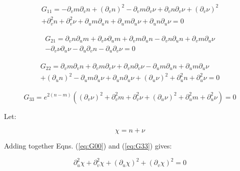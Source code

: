 \documentclass{article}
\begin{document}
\begin{equation}
\begin{split}
G_{11}=-\partial_{v}m\partial_{v}n+\left(\partial_{v}n\right)^{2}-\partial_{v}m\partial_{v}\nu+\partial_{v}n\partial_{v}\nu+\left(\partial_{v}\nu\right)^{2}\\
+\partial_{v}^{2}n+\partial_{v}^{2}\nu+\partial_{u}m\partial_{u}n+\partial_{u}m\partial_{u}\nu+\partial_{u}n\partial_{u}\nu=0
\end{split}
\end{equation}


\begin{equation}
\begin{split}
G_{21}=\partial_{v}n\partial_{u}m+\partial_{v}\nu\partial_{u}m+\partial_{v}m\partial_{u}n-\partial_{v}n\partial_{u}n+\partial_{v}m\partial_{u}\nu\\
-\partial_{v}\nu\partial_{u}\nu-\partial_{u}\partial_{v}n-\partial_{u}\partial_{v}\nu=0
\end{split}
\end{equation}


\begin{equation}
\begin{split}
G_{22}=\partial_{v}m\partial_{v}n+\partial_{v}m\partial_{v}\nu+\partial_{v}n\partial_{v}\nu-\partial_{u}m\partial_{u}n+\partial_{u}m\partial_{u}\nu\\
+\left(\partial_{u}n\right)^{2}-\partial_{u}m\partial_{u}\nu+\partial_{u}n\partial_{u}\nu+\left(\partial_{u}\nu\right)^{2}+\partial_{u}^{2}n+\partial_{u}^{2}\nu=0
\end{split}
\end{equation}

\begin{equation}
G_{33}=e^{2(n-m)}\left(\left(\partial_{v}\nu\right)^{2}+\partial_{v}^{2}m+\partial_{v}^{2}\nu+\left(\partial_{u}\nu\right)^{2}+\partial_{u}^{2}m+\partial_{u}^{2}\nu\right)=0\label{eq:G33}
\end{equation}

Let:

\begin{equation}
\chi=n+\nu
\end{equation}


Adding together Eqns. (\ref{eq:G00}) and (\ref{eq:G33}) gives:

\begin{equation}
\partial_{u}^{2}\chi+\partial_{v}^{2}\chi+\left(\partial_{u}\chi\right)^{2}+\left(\partial_{v}\chi\right)^{2}=0
\end{equation}
\end{document}
